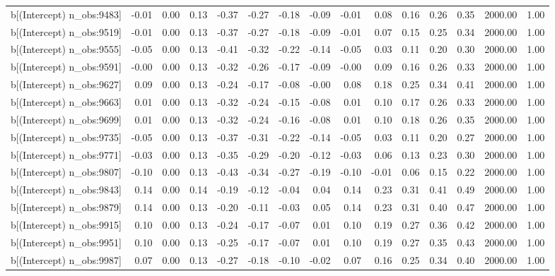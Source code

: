 \begin{table}[ht]
\begin{tabular}{rrrrrrrrrrrrrrr}
  b[(Intercept) n\_obs:9483] & -0.01 & 0.00 & 0.13 & -0.37 & -0.27 & -0.18 & -0.09 & -0.01 & 0.08 & 0.16 & 0.26 & 0.35 & 2000.00 & 1.00 \\ 
  b[(Intercept) n\_obs:9519] & -0.01 & 0.00 & 0.13 & -0.37 & -0.27 & -0.18 & -0.09 & -0.01 & 0.07 & 0.15 & 0.25 & 0.34 & 2000.00 & 1.00 \\ 
  b[(Intercept) n\_obs:9555] & -0.05 & 0.00 & 0.13 & -0.41 & -0.32 & -0.22 & -0.14 & -0.05 & 0.03 & 0.11 & 0.20 & 0.30 & 2000.00 & 1.00 \\ 
  b[(Intercept) n\_obs:9591] & -0.00 & 0.00 & 0.13 & -0.32 & -0.26 & -0.17 & -0.09 & -0.00 & 0.09 & 0.16 & 0.26 & 0.33 & 2000.00 & 1.00 \\ 
  b[(Intercept) n\_obs:9627] & 0.09 & 0.00 & 0.13 & -0.24 & -0.17 & -0.08 & -0.00 & 0.08 & 0.18 & 0.25 & 0.34 & 0.41 & 2000.00 & 1.00 \\ 
  b[(Intercept) n\_obs:9663] & 0.01 & 0.00 & 0.13 & -0.32 & -0.24 & -0.15 & -0.08 & 0.01 & 0.10 & 0.17 & 0.26 & 0.33 & 2000.00 & 1.00 \\ 
  b[(Intercept) n\_obs:9699] & 0.01 & 0.00 & 0.13 & -0.32 & -0.24 & -0.16 & -0.08 & 0.01 & 0.10 & 0.18 & 0.26 & 0.35 & 2000.00 & 1.00 \\ 
  b[(Intercept) n\_obs:9735] & -0.05 & 0.00 & 0.13 & -0.37 & -0.31 & -0.22 & -0.14 & -0.05 & 0.03 & 0.11 & 0.20 & 0.27 & 2000.00 & 1.00 \\ 
  b[(Intercept) n\_obs:9771] & -0.03 & 0.00 & 0.13 & -0.35 & -0.29 & -0.20 & -0.12 & -0.03 & 0.06 & 0.13 & 0.23 & 0.30 & 2000.00 & 1.00 \\ 
  b[(Intercept) n\_obs:9807] & -0.10 & 0.00 & 0.13 & -0.43 & -0.34 & -0.27 & -0.19 & -0.10 & -0.01 & 0.06 & 0.15 & 0.22 & 2000.00 & 1.00 \\ 
  b[(Intercept) n\_obs:9843] & 0.14 & 0.00 & 0.14 & -0.19 & -0.12 & -0.04 & 0.04 & 0.14 & 0.23 & 0.31 & 0.41 & 0.49 & 2000.00 & 1.00 \\ 
  b[(Intercept) n\_obs:9879] & 0.14 & 0.00 & 0.13 & -0.20 & -0.11 & -0.03 & 0.05 & 0.14 & 0.23 & 0.31 & 0.40 & 0.47 & 2000.00 & 1.00 \\ 
  b[(Intercept) n\_obs:9915] & 0.10 & 0.00 & 0.13 & -0.24 & -0.17 & -0.07 & 0.01 & 0.10 & 0.19 & 0.27 & 0.36 & 0.42 & 2000.00 & 1.00 \\ 
  b[(Intercept) n\_obs:9951] & 0.10 & 0.00 & 0.13 & -0.25 & -0.17 & -0.07 & 0.01 & 0.10 & 0.19 & 0.27 & 0.35 & 0.43 & 2000.00 & 1.00 \\ 
  b[(Intercept) n\_obs:9987] & 0.07 & 0.00 & 0.13 & -0.27 & -0.18 & -0.10 & -0.02 & 0.07 & 0.16 & 0.25 & 0.34 & 0.40 & 2000.00 & 1.00 \\ 

\end{tabular}
\end{table}
